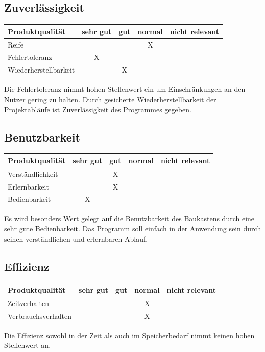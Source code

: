 \documentclass{article}
\begin{document}
\subsection{Zuverlässigkeit}
\begin{table}[H]
\centering
\begin{tabular}{lcccc}
\hline
\textbf{Produktqualität} & sehr gut & gut & normal & nicht relevant \\ \hline
Reife                    &          &     & X      &                \\
Fehlertoleranz           & X        &     &        &                \\
Wiederherstellbarkeit    &          & X   &        &                \\
\end{tabular}
\end{table}
Die Fehlertoleranz nimmt hohen Stellenwert ein um Einschränkungen an den Nutzer gering zu halten. Durch gesicherte Wiederherstellbarkeit der Projektabläufe ist Zuverlässigkeit des Programmes gegeben. 

\subsection{Benutzbarkeit}
\begin{table}[H]
\centering
\begin{tabular}{lcccc}
\hline
\textbf{Produktqualität} & sehr gut & gut & normal & nicht relevant \\ \hline
Verständlichkeit         &          & X   &        &                \\
Erlernbarkeit            &          & X   &        &                \\
Bedienbarkeit            & X        &     &        &                \\
\end{tabular}
\end{table}
Es wird besonders Wert gelegt auf die Benutzbarkeit des Baukastens durch eine sehr gute Bedienbarkeit. Das Programm soll einfach in der Anwendung sein durch seinen verständlichen und erlernbaren Ablauf.

\subsection{Effizienz}
\begin{table}[H]
\centering
\begin{tabular}{lcccc}
\hline
\textbf{Produktqualität} & sehr gut & gut & normal & nicht relevant \\ \hline
Zeitverhalten            &          &     & X      &                \\
Verbrauchsverhalten      &          &     & X      &               
\end{tabular}
\end{table}
Die Effizienz sowohl in der Zeit als auch im Speicherbedarf nimmt keinen hohen Stellenwert an. 
\end{document}
